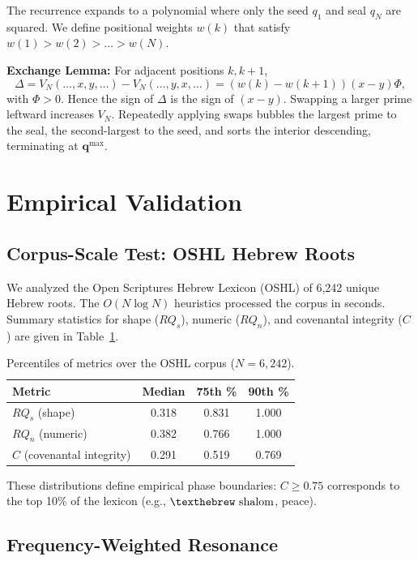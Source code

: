 \documentclass[12pt, a4paper]{article}
\begin{document}
The recurrence expands to a polynomial where only the seed $q_1$ and seal $q_N$ are squared. We define positional weights $w(k)$ that satisfy $w(1) > w(2) > \dots > w(N)$.

\textbf{Exchange Lemma:} For adjacent positions $k, k+1$,
\[
\Delta = V_N(\dots, x, y, \dots) - V_N(\dots, y, x, \dots) = (w(k)-w(k+1))(x-y)\Phi,
\]
with $\Phi > 0$. Hence the sign of $\Delta$ is the sign of $(x-y)$. Swapping a larger prime leftward increases $V_N$. Repeatedly applying swaps bubbles the largest prime to the seal, the second-largest to the seed, and sorts the interior descending, terminating at $\mathbf{q}^{\max}$.

\section{Empirical Validation}

\subsection{Corpus-Scale Test: OSHL Hebrew Roots}

We analyzed the Open Scriptures Hebrew Lexicon (OSHL) of 6,242 unique Hebrew roots. The $O(N \log N)$ heuristics processed the corpus in seconds. Summary statistics for shape ($RQ_s$), numeric ($RQ_n$), and covenantal integrity ($C$) are given in Table~\ref{tab:percentiles}.

\begin{table}[h]
\centering
\caption{Percentiles of metrics over the OSHL corpus ($N=6,242$).}
\label{tab:percentiles}
\begin{tabular}{lccc}
\toprule
Metric & Median & 75th \% & 90th \% \\
\midrule
$RQ_s$ (shape) & 0.318 & 0.831 & 1.000 \\
$RQ_n$ (numeric) & 0.382 & 0.766 & 1.000 \\
$C$ (covenantal integrity) & 0.291 & 0.519 & 0.769 \\
\bottomrule
\end{tabular}
\end{table}

These distributions define empirical phase boundaries: $C \ge 0.75$ corresponds to the top 10\% of the lexicon (e.g., $\text{\texthebrew shalom}$, peace).

\subsection{Frequency-Weighted Resonance}
\end{document}
